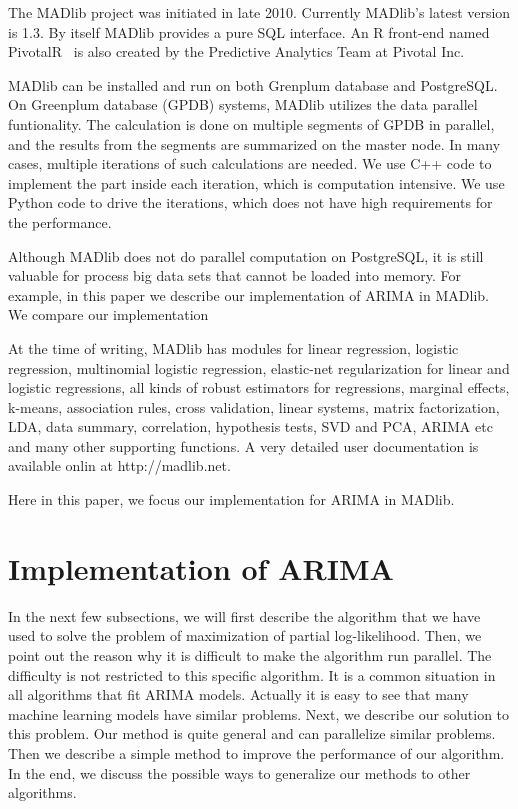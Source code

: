 \documentclass[english,10pt]{llncs}
\begin{document}
The MADlib project was initiated in late 2010. Currently MADlib's latest
version is 1.3. By itself MADlib provides a pure SQL interface. An R
front-end named PivotalR~\cite{pivotalr} is also created by the
Predictive Analytics Team at Pivotal Inc.

MADlib can be installed and run on both Grenplum database and PostgreSQL\@. On
Greenplum database (GPDB) systems, MADlib utilizes the data parallel
funtionality. The calculation is done on multiple segments of GPDB in parallel,
and the results from the segments are summarized on the master node. In many
cases, multiple iterations of such calculations are needed. We use C++ code to
implement the part inside each iteration, which is computation intensive. We
use Python code to drive the iterations, which does not have high requirements
for the performance.

Although MADlib does not do parallel computation on PostgreSQL, it is
still valuable for process big data sets that cannot be loaded into
memory. For example, in this paper we describe our implementation of
ARIMA in MADlib. We compare our implementation 



At the time of writing, MADlib has modules for linear regression,
logistic regression, multinomial logistic regression, elastic-net
regularization for linear and logistic regressions, all kinds of
robust estimators for regressions, marginal effects, k-means,
association rules, cross validation, linear systems, matrix
factorization, LDA, data summary, correlation, hypothesis tests, SVD
and PCA, ARIMA etc and many other supporting functions.  A very
detailed user documentation is available onlin at http://madlib.net.

Here in this paper, we focus our implementation for ARIMA in MADlib.

\section{Implementation of ARIMA}


In the next few subsections, we will first describe the algorithm that
we have used to solve the problem of maximization of partial
log-likelihood. Then, we point out the reason why it is difficult to
make the algorithm run parallel.  The difficulty is not restricted to
this specific algorithm. It is a common situation in all algorithms
that fit ARIMA models. Actually it is easy to see that many machine
learning models have similar problems. Next, we describe our solution
to this problem. Our method is quite general and can parallelize
similar problems. Then we describe a simple method to improve the
performance of our algorithm. In the end, we discuss the possible ways
to generalize our methods to other algorithms.
\end{document}

